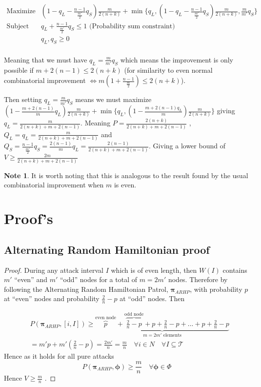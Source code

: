 \documentclass[a4paper,10pt]{article}
\theoremstyle{definition}
\theoremstyle{definition}
\theoremstyle{remark}
\theoremstyle{definition}
\newtheorem*{note}{Note}
\begin{document}
$$\begin{array}{cc}
\text{Maximize} & (1-q_{L}-\frac{n-1}{ \frac{m'}{2}}q_{S}) \frac{m}{2(n+k)} + \min \{ q_{L}, (1-q_{L}-\frac{n-1}{\frac{m'}{2}}q_{S}) \frac{m}{2(n+k)} , \frac{m}{m'}q_{S} \}\\
\text{Subject to } & q_{L}+\frac{n-1}{\frac{m'}{2}}q_{S} \leq 1 \text{  (Probability sum constraint)} \\
     & q_{L},q_{S} \geq 0 \\
\end{array} $$

Meaning that we must have $q_{L}=\frac{m}{m'}q_{S}$ which means the improvement is only possible if $m+2(n-1) \leq 2(n+k)$ (for similarity to even normal combinatorial improvement $\iff m(1+\frac{n-1}{\frac{m}{2}}) \leq 2(n+k)$). 

Then setting $q_{L}=\frac{m}{m'}q_{S}$ means we must maximize $(1-\frac{m+2(n-1)}{m}q_{L})\frac{m}{2(n+k)}+\min\{ q_{L}, (1-\frac{m+2(n-1)q_{L}}{m})\frac{m}{2(n+k)} \}$ giving $q_{L}=\frac{m}{2(n+k)+m+2(n-1)}$. Meaning $P=\frac{2(n+k)}{2(n+k)+m+2(n-1)}$ , $Q_{L}=q_{L}=\frac{m}{2(n+k)+m+2(n-1)}$ and $Q_{S}=\frac{n-1}{\frac{m'}{2}}q_{S}=\frac{2(n-1)}{m}q_{L}=\frac{2(n-1)}{2(n+k)+m+2(n-1)}$. Giving a lower bound of $V \geq \frac{2m}{2(n+k)+m+2(n-1)}$

\begin{note}
It is worth noting that this is analogous to the result found by the usual combinatorial improvement when $m$ is even.
\end{note}


\section{Proof's}

\subsection{Alternating Random Hamiltonian proof}
\label{Alternating Random Hamiltonian proof}

\begin{proof}
During any attack interval $I$ which is of even length, then $W(I)$ contains $m'$ ``even'' and $m'$ ``odd'' nodes for a total of $m=2m'$ nodes. Therefore by following the Alternating Random Hamiltonian Patrol, $\pmb{\pi}_{ARHP}$, with probability $p$ at ``even'' nodes and probability $\frac{2}{n}-p$ at ``odd'' nodes. Then

\begin{align*}
&P(\bm{\pi}_{ARHP},[i,I]) \geq \underbrace{\overbrace{p}^{\text{even node}}+\overbrace{\frac{2}{n}-p}^{\text{odd node}}+p+\frac{2}{n}-p+...+p+\frac{2}{n}-p}_{m=2m' \text{ elements}} \\
&=m' p+m'(\frac{2}{n}-p)=\frac{2m'}{n}=\frac{m}{n} \quad \forall i \in N \quad \forall I \subseteq \mathcal{T}
\end{align*}
Hence as it holds for all pure attacks
$$P(\bm{\pi}_{ARHP},\bm{\phi}) \geq \frac{m}{n} \quad \forall \bm{\phi} \in \Phi$$
Hence $V \geq \frac{m}{n}$ .
\end{proof}
\end{document}
